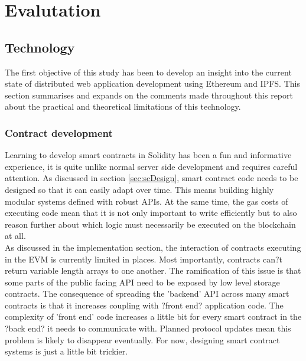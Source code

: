 
\chapter{Evalutation} %
\label{Evaluation} %
\section{Technology}
The first objective of this study has been to develop an insight into the current state of distributed web application development using Ethereum and IPFS. This section summarises and expands on the comments made throughout this report about the practical and theoretical limitations of this technology. \\

\subsection{Contract development}
Learning to develop smart contracts in Solidity has been a fun and informative experience, it is quite unlike normal server side development and requires careful attention. As discussed in section \ref{sec:scDesign}, smart contract code needs to be designed so that it can easily adapt over time. This means building highly modular systems defined with robust APIs. At the same time, the gas costs of executing code mean that it is not only important to write efficiently but to also reason further about which logic must necessarily be executed on the blockchain at all.\\

As discussed in the implementation section, the interaction of contracts executing in the EVM is currently limited in places. Most importantly, contracts can?t return variable length arrays to one another. The ramification of this issue is that some parts of the public facing API need to be exposed by low level storage contracts. The consequence of spreading the 'backend' API across many smart contracts is that it increases coupling with ?front end? application code. The complexity of 'front end' code increases a little bit for every smart contract in the ?back end? it needs to communicate with. Planned protocol updates mean this problem is likely to disappear eventually. For now, designing smart contract systems is just a little bit trickier.\\

